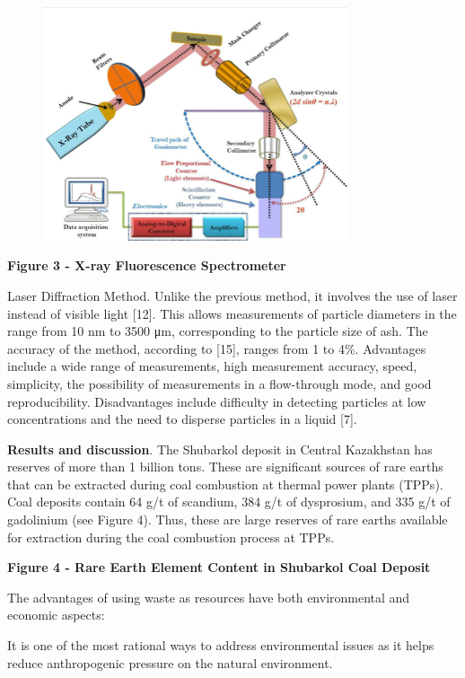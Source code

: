 \begin{figure}[H]
	\centering
	\includegraphics[width=0.8\textwidth]{assets/1051}
	\caption*{}
\end{figure}

\textbf{Figure 3 - X-ray Fluorescence Spectrometer}

Laser Diffraction Method. Unlike the previous method, it involves the
use of laser instead of visible light {[}12{]}. This allows measurements
of particle diameters in the range from 10 nm to 3500 μm, corresponding
to the particle size of ash. The accuracy of the method, according to
{[}15{]}, ranges from 1 to 4\%. Advantages include a wide range of
measurements, high measurement accuracy, speed, simplicity, the
possibility of measurements in a flow-through mode, and good
reproducibility. Disadvantages include difficulty in detecting particles
at low concentrations and the need to disperse particles in a liquid
{[}7{]}.

\textbf{Results and discussion}. The Shubarkol deposit in Central
Kazakhstan has reserves of more than 1 billion tons. These are
significant sources of rare earths that can be extracted during coal
combustion at thermal power plants (TPPs). Coal deposits contain 64 g/t
of scandium, 384 g/t of dysprosium, and 335 g/t of gadolinium (see
Figure 4). Thus, these are large reserves of rare earths available for
extraction during the coal combustion process at TPPs.

\textbf{Figure 4 - Rare Earth Element Content in Shubarkol Coal Deposit}

The advantages of using waste as resources have both environmental and
economic aspects:

It is one of the most rational ways to address environmental issues as
it helps reduce anthropogenic pressure on the natural environment.

